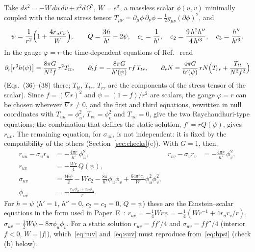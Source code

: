 \documentclass[11pt]{article}
\begin{document}
Take $ds^{2}=-W\,du\,dv+r^{2}d\Omega^{2}$, $W=e^{\sigma}$, a massless scalar $\phi(u,v)$ minimally coupled with the usual stress tensor $T_{\mu\nu}=\partial_\mu\phi\,\partial_\nu\phi-\tfrac12 g_{\mu\nu}(\partial\phi)^{2}$, and
\begin{equation}
\psi=\frac{1}{r^{2}}\Bigl(1+\frac{4r_ur_v}{W}\Bigr),\qquad Q=\frac{3h}{h'}-2\psi,\quad c_1=\frac1{h'},\quad c_2=\frac{9\,h^{2}h''}{4\,h'^{3}},\quad c_3=\frac{h''}{h'^{3}} .
\end{equation}
In the gauge $\varphi=r$ the time-dependent equations of Ref.~\cite{BuenoCanoHennigarMurcia2025} read
\begin{equation}
\partial_r\!\bigl[r^{3}h(\psi)\bigr]=\frac{8\pi G}{N^{2}f}\,r^{2}T_{tt},\qquad
\partial_tf=-\frac{8\pi G}{h'(\psi)}\,rf\,T_{tr},\qquad
\partial_rN=\frac{4\pi G}{h'(\psi)}\,rN\Bigl(T_{rr}+\frac{T_{tt}}{N^{2}f^{2}}\Bigr)
\end{equation}
(Eqs.~(36)--(38) there; $T_{tt}$, $T_{tr}$, $T_{rr}$ are the components of the stress tensor of the scalar). Since $f=(\nabla r)^{2}$ and $\psi=(1-f)/r^{2}$ are scalars, the gauge $\varphi=r$ can be chosen wherever $\nabla r\neq0$, and the first and third equations, rewritten in null coordinates with $T_{uu}=\phi_u^{2}$, $T_{vv}=\phi_v^{2}$ and $T_{uv}=0$, give the two Raychaudhuri-type equations; the combination that defines the static solution, $f'=rQ(\psi)$, gives $r_{uv}$. The remaining equation, for $\sigma_{uv}$, is not independent: it is fixed by the compatibility of the others (Section~\ref{sec:checks}(e)). With $G=1$, then,
\begin{align}
r_{uu}-\sigma_ur_u&=-\frac{4\pi r}{h'}\,\phi_u^{2}, & r_{vv}-\sigma_vr_v&=-\frac{4\pi r}{h'}\,\phi_v^{2},\label{eq:ray}\\
r_{uv}&=-\frac{Wr}{4}\,Q(\psi),\label{eq:ruv}\\
\sigma_{uv}&=\frac{W\psi}{2}-W c_2-\frac{8\pi}{h'}\phi_u\phi_v+\frac{64\pi^{2}c_3}{W}\phi_u^{2}\phi_v^{2},\label{eq:suv}\\
\phi_{uv}&=-\frac{r_u\phi_v+r_v\phi_u}{r}.\label{eq:phi}
\end{align}
For $h=\psi$ ($h'=1$, $h''=0$, $c_2=c_3=0$, $Q=\psi$) these are the Einstein--scalar equations in the form used in Paper~E~\citep{PaperE}: $r_{uv}=-\tfrac14 W r\psi=-\tfrac14(W r^{-1}+4r_ur_v/r)$, $\sigma_{uv}=\tfrac12W\psi-8\pi\phi_u\phi_v$. For a static solution $r_{uv}=ff'/4$ and $\sigma_{uv}=ff''/4$ (interior $f<0$, $W=|f|$), which~\eqref{eq:ruv} and~\eqref{eq:suv} must reproduce from~\eqref{eq:hpsi} (check (b) below).
\end{document}
